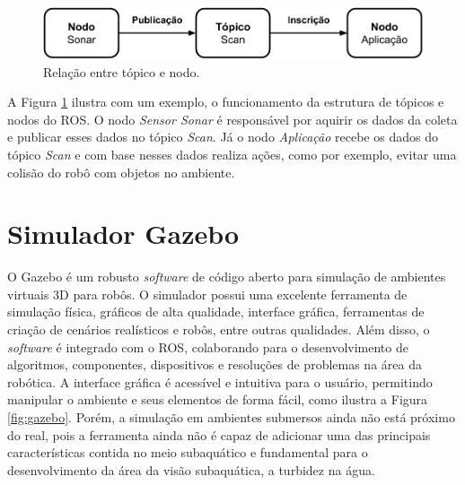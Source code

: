 \begin{figure}[H]
    \centering
    \includegraphics[scale=0.6]{dados/figuras/topic_node.png}
    \caption{Relação entre tópico e nodo.}
    \label{fig:topic_node}
\end{figure}

A Figura \ref{fig:topic_node} ilustra com um exemplo, o funcionamento da estrutura de tópicos e nodos do ROS. O nodo \textit{Sensor Sonar} é responsável por aquirir os dados da coleta e publicar esses dados no tópico \textit{Scan}. Já o nodo \textit{Aplicação} recebe os dados do tópico \textit{Scan} e com base nesses dados realiza ações, como por exemplo, evitar uma colisão do robô com objetos no ambiente.

\section{Simulador Gazebo}
\label{sec:gazebo}

O Gazebo é um robusto \textit{software} de código aberto para simulação de ambientes virtuais 3D para robôs. O simulador possui uma excelente ferramenta de simulação física, gráficos de alta qualidade, interface gráfica, ferramentas de criação de cenários realísticos e robôs, entre outras qualidades. Além disso, o \textit{software} é integrado com o ROS, colaborando para o desenvolvimento de algoritmos, componentes, dispositivos e resoluções de problemas na área da robótica. A interface gráfica é acessível e intuitiva para o usuário, permitindo manipular o ambiente e seus elementos de forma fácil, como ilustra a Figura \ref{fig:gazebo}. Porém, a simulação em ambientes submersos ainda não está próximo do real, pois a ferramenta ainda não é capaz de adicionar uma das principais características contida no meio subaquático e fundamental para o desenvolvimento da área da visão subaquática, a turbidez na água. 

